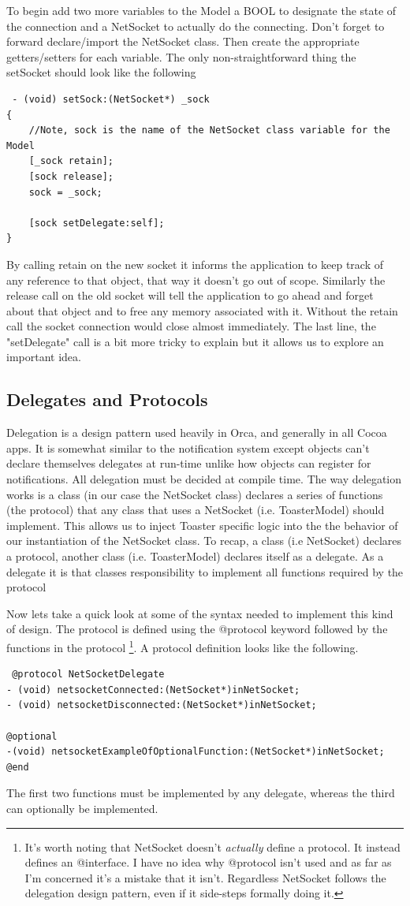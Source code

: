 \documentclass[12pt,a4paper]{article}
\begin{document}
 To begin add two more variables to the Model a BOOL to designate the state of the connection and a NetSocket to actually do the connecting.
 Don't forget to forward declare/import the NetSocket class.
 Then create the appropriate getters/setters for each variable.
 The only non-straightforward thing the setSocket should look like the following
\begin{lstlisting}
 - (void) setSock:(NetSocket*) _sock
{
    //Note, sock is the name of the NetSocket class variable for the Model
    [_sock retain];
    [sock release];
    sock = _sock;
    
    [sock setDelegate:self];  
}
\end{lstlisting}
By calling retain on the new socket it informs the application to keep track of any reference to that object, that way it doesn't go out of scope.
Similarly the release call on the old socket will tell the application to go ahead and forget about that object and to free any memory associated with it.
Without the retain call the socket connection would close almost immediately.  
The last line, the "setDelegate" call is a bit more tricky to explain but it allows us to explore an important idea.
\subsection{Delegates and Protocols}
Delegation is a design pattern used heavily in Orca, and generally in all Cocoa apps. 
It is somewhat similar to the notification system except objects can't declare themselves delegates at run-time unlike how objects can register for notifications.
 All delegation must be decided at compile time.
 The way delegation works is a class (in our case the NetSocket class) declares a series of functions (the protocol) that any class that uses a NetSocket (i.e. ToasterModel) should implement.
  This allows us to inject Toaster specific logic into the the behavior of our instantiation of the NetSocket class. 
  To recap, a class (i.e NetSocket) declares a protocol, another class (i.e. ToasterModel) declares itself as a delegate. 
  As a delegate it is that classes responsibility to implement all functions required by the protocol
  
Now lets take a quick look at some of the syntax needed to implement this kind of design.
The protocol is defined using the @protocol keyword followed by the functions in the protocol
\footnote
{
It's worth noting that NetSocket doesn't \emph{actually} define a protocol.
 It instead defines an @interface.
 I have no idea why @protocol isn't used and as far as I'm concerned it's a mistake that it isn't.
 Regardless NetSocket follows the delegation design pattern, even if it side-steps formally doing it.
 }.
 A protocol definition looks like the following.
 \begin{lstlisting}
 @protocol NetSocketDelegate
- (void) netsocketConnected:(NetSocket*)inNetSocket;
- (void) netsocketDisconnected:(NetSocket*)inNetSocket; 

@optional
-(void) netsocketExampleOfOptionalFunction:(NetSocket*)inNetSocket;
@end
 \end{lstlisting}
 The first two functions must be implemented by any delegate, whereas the third can optionally be implemented.
 
\end{document}
